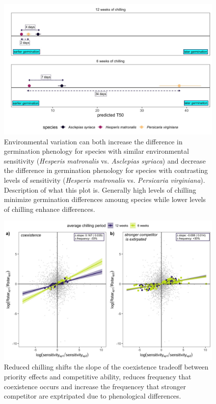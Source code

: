 \documentclass{article}[12pt]
\begin{document}
\begin{figure}[h!]
  \centering
 \includegraphics[width=\textwidth]{..//plots/sps_case_examps.jpeg}
    \caption{Environmental variation can both increase the difference in germination phenology for species with similar environmental sensitivity (\emph{Hesperis matronalis} vs. \emph{Asclepias syriaca}) and decrease the difference in germination phenology for species with contrasting levels of sensitivity (\emph{Hesperis matronalis} vs. \emph{Persicaria virginiana}). Description of what this plot is. Generally high levels of chilling minimize germination differences amoung species while lower levels of chilling enhance differences.}
    \label{Fig:case}
\end{figure}


\begin{figure}[h!]
  \centering
 \includegraphics[width=\textwidth]{..//plots/coexistance_runner.jpeg}
    \caption{Reduced chilling shifts the slope of the coexistence tradeoff between priority effects and competitive ability, reduces frequency that coexistence occurs and increase the frequencey that stronger competitor are exptripated due to phenological differences.}
    \label{Fig:coexistence}
\end{figure}
\end{document}
